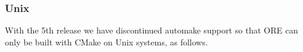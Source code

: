 \documentclass[12pt, a4paper]{article}
\begin{document}
\subsubsection*{Unix}

%
%
%
%
%
%
%
%
%
%
%
%
%
%
%

%
%
%
%
%

With the 5th release we have discontinued automake support so that ORE can only be built with CMake on Unix systems, as follows.
\end{document}
